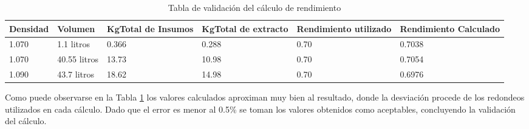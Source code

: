 \begin{table}[H]
    \centering
    \begin{tabularx}{\textwidth}{|X|X|X|X|X|X|}
        \hline
        Densidad & Volumen & KgTotal de Insumos & KgTotal de extracto & Rendimiento utilizado & Rendimiento Calculado \\
        \hline
        \hline
        1.070 & 1.1 litros & 0.366 & 0.288 & 0.70 & 0.7038\\ \hline
        1.070 & 40.55 litros & 13.73 & 10.98 & 0.70 & 0.7054 \\ \hline
        1.090 & 43.7 litros & 18.62 & 14.98 & 0.70 & 0.6976 \\ \hline
    \end{tabularx}
    \caption{Tabla de validación del cálculo de rendimiento  }
    \label{tab:rendimiento}
\end{table}

\par Como puede observarse en la Tabla \ref{tab:rendimiento} los valores calculados aproximan muy bien al resultado, donde la desviación procede de los redondeos utilizados en cada cálculo. Dado que el error es menor al 0.5\% se toman los valores obtenidos como aceptables, concluyendo la validación del cálculo.

